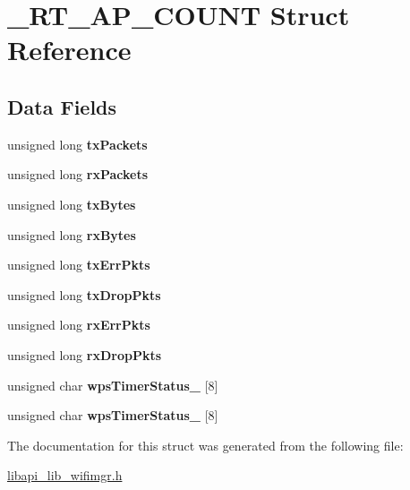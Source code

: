 \hypertarget{struct__RT__AP__COUNT}{}\section{\+\_\+\+R\+T\+\_\+\+A\+P\+\_\+\+C\+O\+U\+NT Struct Reference}
\label{struct__RT__AP__COUNT}
\subsection*{Data Fields}
\begin{DoxyCompactItemize}
\item 
\mbox{\label{struct__RT__AP__COUNT_a46b37400966b5a12dcb741e81102a913}} 
unsigned long {\bfseries tx\+Packets}
\item 
\mbox{\label{struct__RT__AP__COUNT_ac8dceb789979236ba7012fb37b4293f5}} 
unsigned long {\bfseries rx\+Packets}
\item 
\mbox{\label{struct__RT__AP__COUNT_a7daa4a02f7b031250d1b346813a7a148}} 
unsigned long {\bfseries tx\+Bytes}
\item 
\mbox{\label{struct__RT__AP__COUNT_a3f5e38ddd70e57ce43ac07239466f2f3}} 
unsigned long {\bfseries rx\+Bytes}
\item 
\mbox{\label{struct__RT__AP__COUNT_a91a1d782544579983da55abd22c7bb2b}} 
unsigned long {\bfseries tx\+Err\+Pkts}
\item 
\mbox{\label{struct__RT__AP__COUNT_aa1378251313f3be05678f9c575d09745}} 
unsigned long {\bfseries tx\+Drop\+Pkts}
\item 
\mbox{\label{struct__RT__AP__COUNT_a5947c09fe4c7d136c971c60364c1ab31}} 
unsigned long {\bfseries rx\+Err\+Pkts}
\item 
\mbox{\label{struct__RT__AP__COUNT_a0626fe25fc1646358c218391964e32db}} 
unsigned long {\bfseries rx\+Drop\+Pkts}
\item 
\mbox{\label{struct__RT__AP__COUNT_a81e42f8af63ffd3f8051e707cbdff277}} 
unsigned char {\bfseries wps\+Timer\+Status\+\_} \mbox{[}8\mbox{]}
\item 
\mbox{\label{struct__RT__AP__COUNT_af521de3cb6ae56fa466b35b0b8d2a746}} 
unsigned char {\bfseries wps\+Timer\+Status\+\_} \mbox{[}8\mbox{]}
\end{DoxyCompactItemize}


The documentation for this struct was generated from the following file\+:\begin{DoxyCompactItemize}
\item 
\hyperlink{libapi__lib__wifimgr_8h}{libapi\+\_\+lib\+\_\+wifimgr.\+h}\end{DoxyCompactItemize}
